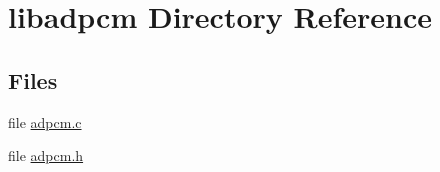 \hypertarget{dir_000001}{}\section{libadpcm Directory Reference}
\label{dir_000001}
\subsection*{Files}
\begin{DoxyCompactItemize}
\item 
file \hyperlink{adpcm_8c}{adpcm.\+c}
\item 
file \hyperlink{adpcm_8h}{adpcm.\+h}
\end{DoxyCompactItemize}

